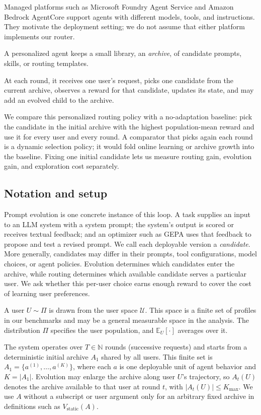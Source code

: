 \documentclass{article} %
\providecommand{\E}{\mathbb{E}}
\begin{document}
\label{sec:method-plain}
Managed platforms such as Microsoft Foundry Agent Service and Amazon Bedrock AgentCore \citep{microsoft2026foundryagents,aws2026agentcore} support agents with different models, tools, and instructions. They motivate the deployment setting; we do not assume that either platform implements our router.

A personalized agent keeps a small library, an \emph{archive}, of candidate prompts, skills, or routing templates.

At each round, it receives one user's request, picks one candidate from the current archive, observes a reward for that candidate, updates its state, and may add an evolved child to the archive.

We compare this personalized routing policy with a no-adaptation baseline: pick the candidate in the initial archive with the highest population-mean reward and use it for every user and every round. A comparator that picks again each round is a dynamic selection policy; it would fold online learning or archive growth into the baseline. Fixing one initial candidate lets us measure routing gain, evolution gain, and exploration cost separately.

\subsection{Notation and setup}

\label{sec:method-notation}
Prompt evolution is one concrete instance of this loop. A task supplies an input to an LLM system with a system prompt; the system's output is scored or receives textual feedback; and an optimizer such as GEPA \citep{agrawal2025geparp} uses that feedback to propose and test a revised prompt. We call each deployable version a \emph{candidate}. More generally, candidates may differ in their prompts, tool configurations, model choices, or agent policies. Evolution determines which candidates enter the archive, while routing determines which available candidate serves a particular user. We ask whether this per-user choice earns enough reward to cover the cost of learning user preferences.

A user $U \sim \Pi$ is drawn from the user space $\mathcal{U}$. This space is a finite set of profiles in our benchmarks and may be a general measurable space in the analysis. The distribution $\Pi$ specifies the user population, and $\E_U[\cdot]$ averages over it.

The system operates over $T \in \mathbb{N}$ rounds (successive requests) and starts from a deterministic initial archive $A_1$ shared by all users. This finite set is $A_1 = \{a^{(1)}, \dots, a^{(K)}\}$, where each $a$ is one deployable unit of agent behavior and $K = |A_1|$. Evolution may enlarge the archive along user $U$'s trajectory, so $A_t(U)$ denotes the archive available to that user at round $t$, with $|A_t(U)| \leq K_{\max}$. We use $A$ without a subscript or user argument only for an arbitrary fixed archive in definitions such as $V_{\mathrm{static}}(A)$.
\end{document}
